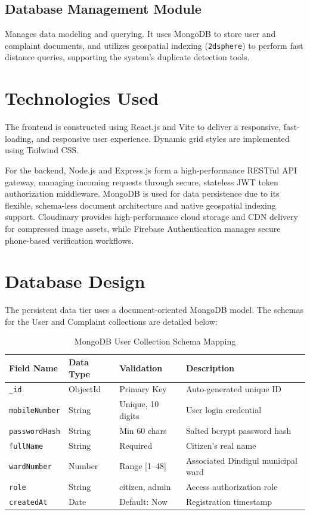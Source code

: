\documentclass[conference]{IEEEtran}
\begin{document}
\subsection{Database Management Module}
Manages data modeling and querying. It uses MongoDB to store user and complaint documents, and utilizes geospatial indexing (\texttt{2dsphere}) to perform fast distance queries, supporting the system's duplicate detection tools.

\section{Technologies Used}
The frontend is constructed using React.js and Vite to deliver a responsive, fast-loading, and responsive user experience. Dynamic grid styles are implemented using Tailwind CSS. 

For the backend, Node.js and Express.js form a high-performance RESTful API gateway, managing incoming requests through secure, stateless JWT token authorization middleware. MongoDB is used for data persistence due to its flexible, schema-less document architecture and native geospatial indexing support. Cloudinary provides high-performance cloud storage and CDN delivery for compressed image assets, while Firebase Authentication manages secure phone-based verification workflows.

\section{Database Design}
The persistent data tier uses a document-oriented MongoDB model. The schemas for the User and Complaint collections are detailed below:

\begin{table}[htbp]
\centering
\caption{MongoDB User Collection Schema Mapping}
\label{tab:user_schema}
\begin{tabularx}{\columnwidth}{l l l X}
\toprule
Field Name & Data Type & Validation & Description \\
\midrule
\texttt{\_id} & ObjectId & Primary Key & Auto-generated unique ID \\
\texttt{mobileNumber} & String & Unique, 10 digits & User login credential \\
\texttt{passwordHash} & String & Min 60 chars & Salted bcrypt password hash \\
\texttt{fullName} & String & Required & Citizen's real name \\
\texttt{wardNumber} & Number & Range [1--48] & Associated Dindigul municipal ward \\
\texttt{role} & String & citizen, admin & Access authorization role \\
\texttt{createdAt} & Date & Default: Now & Registration timestamp \\
\bottomrule
\end{tabularx}
\end{table}
\end{document}
